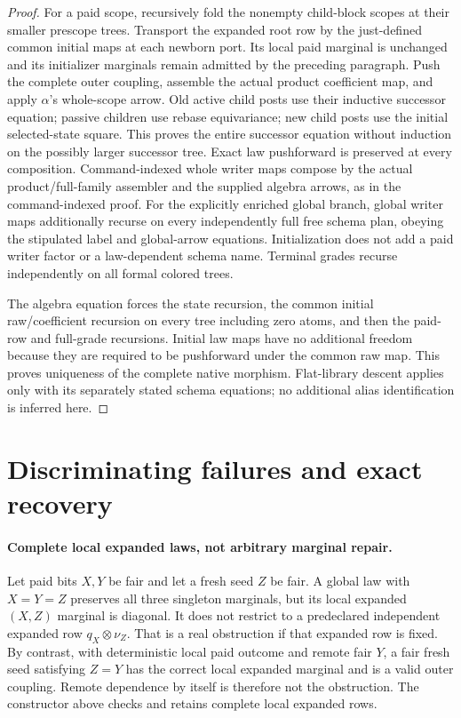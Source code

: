 \documentclass[11pt]{article}
\begin{document}
\begin{proof}
For a paid scope, recursively fold the nonempty child-block scopes at their smaller prescope trees. Transport the expanded root row by the just-defined common initial maps at each newborn port. Its local paid marginal is unchanged and its initializer marginals remain admitted by the preceding paragraph. Push the complete outer coupling, assemble the actual product coefficient map, and apply $\alpha$'s whole-scope arrow. Old active child posts use their inductive successor equation; passive children use rebase equivariance; new child posts use the initial selected-state square. This proves the entire successor equation without induction on the possibly larger successor tree. Exact law pushforward is preserved at every composition. Command-indexed whole writer maps compose by the actual product/full-family assembler and the supplied algebra arrows, as in the command-indexed proof. For the explicitly enriched global branch, global writer maps additionally recurse on every independently full free schema plan, obeying the stipulated label and global-arrow equations. Initialization does not add a paid writer factor or a law-dependent schema name. Terminal grades recurse independently on all formal colored trees.

The algebra equation forces the state recursion, the common initial raw/coefficient recursion on every tree including zero atoms, and then the paid-row and full-grade recursions. Initial law maps have no additional freedom because they are required to be pushforward under the common raw map. This proves uniqueness of the complete native morphism. Flat-library descent applies only with its separately stated schema equations; no additional alias identification is inferred here.\end{proof}

\section{Discriminating failures and exact recovery}
\paragraph{Complete local expanded laws, not arbitrary marginal repair.}
Let paid bits $X,Y$ be fair and let a fresh seed $Z$ be fair. A global law with $X=Y=Z$ preserves all three singleton marginals, but its local expanded $(X,Z)$ marginal is diagonal. It does not restrict to a predeclared independent expanded row $q_X\otimes\nu_Z$. That is a real obstruction if that expanded row is fixed. By contrast, with deterministic local paid outcome and remote fair $Y$, a fair fresh seed satisfying $Z=Y$ has the correct local expanded marginal and is a valid outer coupling. Remote dependence by itself is therefore not the obstruction. The constructor above checks and retains complete local expanded rows.
\end{document}
